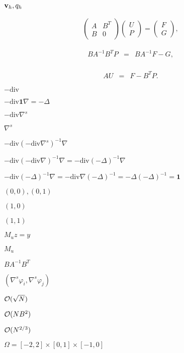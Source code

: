 \documentclass{article}
\begin{document}
$\textbf v_h, q_h$
\pagebreak

\begin{eqnarray*} \left(\begin{array}{cc} A & B^T \\ B & 0 \end{array}\right) \left(\begin{array}{c} U \\ P \end{array}\right) = \left(\begin{array}{c} F \\ G \end{array}\right), \end{eqnarray*}
\pagebreak

\begin{eqnarray*} BA^{-1}B^T P &=& BA^{-1} F - G, \\ \end{eqnarray*}
\pagebreak

\begin{eqnarray*} AU &=& F - B^TP. \end{eqnarray*}
\pagebreak

$-\textrm{div}$
\pagebreak

$-\textrm{div} \mathbf 1 \nabla = -\Delta$
\pagebreak

$-\textrm{div} \nabla^s$
\pagebreak

$\nabla^s$
\pagebreak

$-\textrm{div} (-\textrm{div} \nabla^s)^{-1} \nabla$
\pagebreak

$-\textrm{div} (-\textrm{div} \nabla)^{-1} \nabla = -\textrm{div} (-\Delta)^{-1} \nabla$
\pagebreak

$-\textrm{div}(-\Delta)^{-1} \nabla = -\textrm{div}\nabla(-\Delta)^{-1} = -\Delta(-\Delta)^{-1} = \mathbf 1$
\pagebreak

$(0,0),(0,1)$
\pagebreak

$(1,0)$
\pagebreak

$(1,1)$
\pagebreak

$M_uz=y$
\pagebreak

$M_u$
\pagebreak

$BA^{-1}B^T$
\pagebreak

$(\nabla^s \varphi_i, \nabla^s\varphi_j)$
\pagebreak

${\cal O}(\sqrt{N})$
\pagebreak

${\cal O}(NB^2)$
\pagebreak

${\cal O}(N^{2/3})$
\pagebreak

$\Omega=[-2,2]\times[0,1]\times[-1,0]$
\pagebreak
\end{document}

